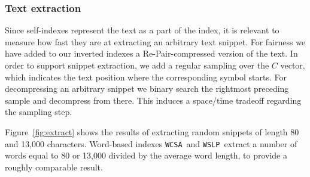 \documentclass[review]{elsarticle}
\newcommand{\repair}{Re-Pair}
\newcommand{\simplen}{\texttt{Simple9}}
\newcommand{\vbyteLZMA}{\texttt{Vbyte-LZMA}}
\newcommand{\rlcsa}{\texttt{RLCSA}}
\newcommand{\wcsa}{\texttt{WCSA}}
\newcommand{\wslp}{\texttt{WSLP}}
\newcommand{\lzindex}{\texttt{LZ77-index}}
\newcommand{\lzendindex}{\texttt{LZend-index}}
\begin{document}
%

\subsubsection{Text extraction} \label{exp:pos:extract}

Since self-indexes represent the text as a part of the index, it is relevant
to measure how fast they are at extracting an arbitrary text snippet. For
fairness we have added to our inverted indexes a \repair-compressed version
of the text. In order to support snippet extraction, we add a regular
sampling over the $C$ vector, which indicates the text position where the
corresponding symbol starts. For decompressing an arbitrary snippet we binary
search the rightmost preceding sample and decompress from there. This induces
a space/time tradeoff regarding the sampling step.

Figure~\ref{fig:extract} shows the results of extracting random snippets
of length 80 and 13,000 characters. Word-based indexes \wcsa\ and \wslp\ extract a number of
words equal to 80 or 13,000 divided by the average word length, to provide
a roughly comparable result. 
\end{document}
